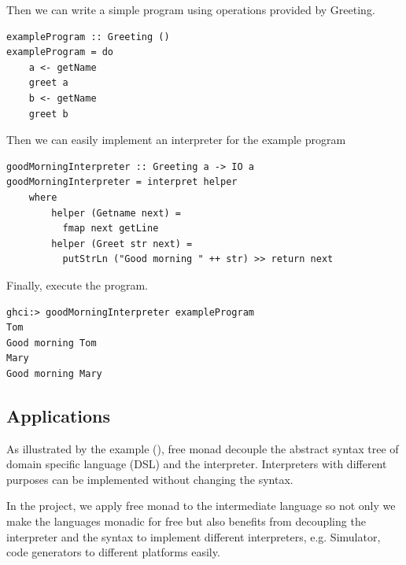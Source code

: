 Then we can write a simple program using operations provided by Greeting.
\begin{verbatim}
exampleProgram :: Greeting ()
exampleProgram = do
    a <- getName
    greet a
    b <- getName
    greet b
\end{verbatim}
Then we can easily implement an interpreter for the example program
\begin{verbatim}
goodMorningInterpreter :: Greeting a -> IO a
goodMorningInterpreter = interpret helper
    where
        helper (Getname next) = 
          fmap next getLine
        helper (Greet str next) =
          putStrLn ("Good morning " ++ str) >> return next  
\end{verbatim} 
Finally, execute the program.
\begin{verbatim}
ghci:> goodMorningInterpreter exampleProgram
Tom
Good morning Tom
Mary
Good morning Mary
\end{verbatim}

\subsection{Applications} \label{b:fm:a}
As illustrated by the example (), free monad decouple the abstract syntax tree of domain specific language (DSL) and the interpreter. Interpreters with different purposes can be implemented without changing the syntax.

In the project, we apply free monad to the intermediate language so not only we make the languages monadic for free but also benefits from decoupling the interpreter and the syntax to implement different interpreters, e.g. Simulator, code generators to different platforms easily.